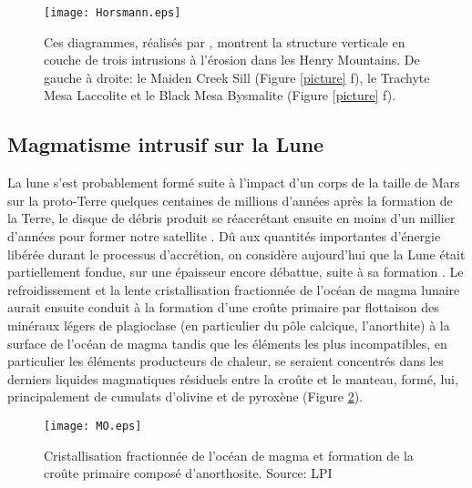 \begin{figure}[htpb]
  \begin{center}
    \graphicspath{ {/Users/thorey/Documents/These/Manuscript/Figure/Chapter1/} }
    \texttt{[image: Horsmann.eps]}
    \caption{Ces  diagrammes,  réalisés  par  \citet{Horsman:2009gea},
      montrent la structure verticale en  couche de trois intrusions à
      l'érosion  dans les  Henry  Mountains. De  gauche  à droite:  le
      Maiden  Creek Sill  (Figure \ref{picture}  f), le  Trachyte Mesa
      Laccolite et le Black Mesa Bysmalite (Figure \ref{picture} f).}
    \label{Horsmann}
  \end{center}
\end{figure}

\subsection{Magmatisme intrusif sur la Lune}
\label{sec:moon}

La lune  s'est probablement formé  suite à  l'impact d'un corps  de la
taille  de Mars  sur  la proto-Terre  quelques  centaines de  millions
d'années après la  formation de la Terre, le disque  de débris produit
se  réaccrétant ensuite  en moins  d'un millier  d'années pour  former
notre                                                        satellite
\citep{Mizutani:1972hc,Cameron:1991vu,Canup:2001eb,Canup:2012cd}.   Dû
aux  quantités  importantes  d'énergie  libérée  durant  le  processus
d'accrétion, on considère aujourd'hui  que la Lune était partiellement
fondue,  sur  une épaisseur  encore  débattue,  suite à  sa  formation
\citep{ElkinsTanton:2011ce}.    Le   refroidissement   et   la   lente
cristallisation fractionnée de l'océan de magma lunaire aurait ensuite
conduit  à  la formation  d'une  croûte  primaire par  flottaison  des
minéraux  légers  de plagioclase  (en  particulier  du pôle  calcique,
l'anorthite) à la surface de l'océan  de magma tandis que les éléments
les  plus incompatibles,  en particulier  les éléments  producteurs de
chaleur, se seraient concentrés dans les derniers liquides magmatiques
résiduels entre la croûte et le manteau, formé, lui, principalement de
cumulats d'olivine et de pyroxène (Figure \ref{MO}).

\begin{figure}[htpb]
  \begin{center}
    \graphicspath{ {/Users/thorey/Documents/These/Manuscript/Figure/Chapter1/} }
    \texttt{[image: MO.eps]}
    \caption{Cristallisation  fractionnée  de   l'océan  de  magma  et
      formation de  la croûte primaire composé  d'anorthosite. Source:
      LPI}
    \label{MO}
  \end{center}
\end{figure}

